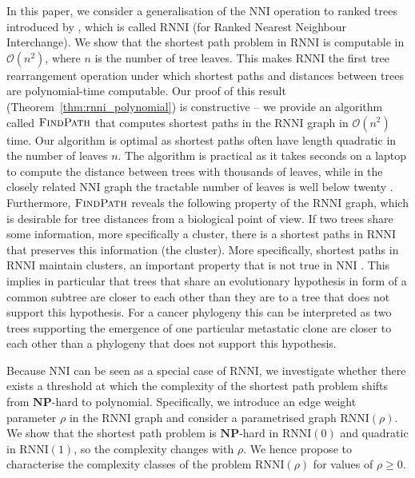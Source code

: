 \documentclass[11pt]{amsart}
\newcommand{\rnni}{\mathrm{RNNI}}
\newcommand{\findpath}{\textsc{FindPath}}
\newcommand{\nni}{\mathrm{NNI}}
\newcommand{\np}{\mathbf{NP}}
\renewcommand{\O}{\mathcal O}
\begin{document}
In this paper, we consider a generalisation of the $\nni$ operation to ranked trees introduced by \textcite{Gavryushkin2018-ol}, which is called $\rnni$ (for Ranked Nearest Neighbour Interchange).
We show that the shortest path problem in $\rnni$ is computable in $\O(n^2)$, where $n$ is the number of tree leaves.
This makes $\rnni$ the first tree rearrangement operation under which shortest paths and distances between trees are polynomial-time computable.
Our proof of this result (Theorem~\ref{thm:rnni_polynomial}) is constructive -- we provide an algorithm called $\findpath$ that computes shortest paths in the $\rnni$ graph in $\O(n^2)$ time.
Our algorithm is optimal as shortest paths often have length quadratic in the number of leaves $n$.
The algorithm is practical as it takes seconds on a laptop to compute the distance between trees with thousands of leaves, while in the closely related $\nni$ graph the tractable number of leaves is well below twenty \autocite{Li1996-zw, Whidden2016-kl}.
Furthermore, $\findpath$ reveals the following property of the $\rnni$ graph, which is desirable for tree distances from a biological point of view.
If two trees share some information, more specifically a cluster, there is a shortest paths in $\rnni$ that preserves this information (the cluster).
More specifically, shortest paths in $\rnni$ maintain clusters, an important property that is not true in $\nni$ \autocite{Li1996-zw}.
This implies in particular that trees that share an evolutionary hypothesis in form of a common subtree are closer to each other than they are to a tree that does not support this hypothesis.
For a cancer phylogeny this can be interpreted as two trees supporting the emergence of one particular metastatic clone are closer to each other than a phylogeny that does not support this hypothesis.

Because $\nni$ can be seen as a special case of $\rnni$, we investigate whether there exists a threshold at which the complexity of the shortest path problem shifts from $\np$-hard to polynomial.
Specifically, we introduce an edge weight parameter $\rho$ in the $\rnni$ graph and consider a parametrised graph $\rnni(\rho)$.
We show that the shortest path problem is $\np$-hard in $\rnni(0)$ and quadratic in $\rnni(1)$, so the complexity changes with $\rho$.
We hence propose to characterise the complexity classes of the problem $\rnni(\rho)$ for values of $\rho \geq 0$.
\end{document}
